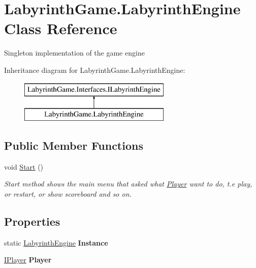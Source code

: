 \hypertarget{class_labyrinth_game_1_1_labyrinth_engine}{\section{Labyrinth\+Game.\+Labyrinth\+Engine Class Reference}
\label{class_labyrinth_game_1_1_labyrinth_engine}
}


Singleton implementation of the game engine  


Inheritance diagram for Labyrinth\+Game.\+Labyrinth\+Engine\+:\begin{figure}[H]
\begin{center}
\leavevmode
\includegraphics[height=2.000000cm]{class_labyrinth_game_1_1_labyrinth_engine}
\end{center}
\end{figure}
\subsection*{Public Member Functions}
\begin{DoxyCompactItemize}
\item 
void \hyperlink{class_labyrinth_game_1_1_labyrinth_engine_a2ee1c701e5518bc9779c875c93291ccd}{Start} ()
\begin{DoxyCompactList}\small\item\em Start method shows the main menu that asked what \hyperlink{class_labyrinth_game_1_1_player}{Player} want to do, t.\+e play, or restart, or show scoreboard and so on. \end{DoxyCompactList}\end{DoxyCompactItemize}
\subsection*{Properties}
\begin{DoxyCompactItemize}
\item 
\hypertarget{class_labyrinth_game_1_1_labyrinth_engine_a42effc304f6c0e2e9fd4010c3ca65eaa}{static \hyperlink{class_labyrinth_game_1_1_labyrinth_engine}{Labyrinth\+Engine} {\bfseries Instance}}\label{class_labyrinth_game_1_1_labyrinth_engine_a42effc304f6c0e2e9fd4010c3ca65eaa}

\item 
\hypertarget{class_labyrinth_game_1_1_labyrinth_engine_a550e4112b72a04de5c4012e424e53a07}{\hyperlink{interface_labyrinth_game_1_1_interfaces_1_1_i_player}{I\+Player} {\bfseries Player}}\label{class_labyrinth_game_1_1_labyrinth_engine_a550e4112b72a04de5c4012e424e53a07}

\end{DoxyCompactItemize}


